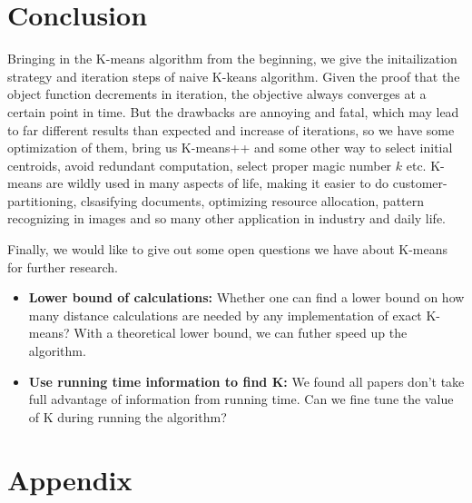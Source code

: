 \documentclass[11pt]{article}
\begin{document}
\section{Conclusion}
Bringing in the K-means algorithm from the beginning, we give the initailization strategy and iteration steps of naive K-keans algorithm.
Given the proof that the object function decrements in iteration, the objective always converges at a certain point in time. But the drawbacks are annoying and fatal, which may lead to far different results than expected and increase of iterations, so we have some optimization of them, bring us K-means++ and some other way to select initial centroids, avoid redundant computation, select proper magic number $k$ etc.
K-means are wildly used in many aspects of life, making it easier to do customer-partitioning, clsasifying documents, optimizing resource allocation, pattern recognizing in images and so many other application in industry and daily life.\par
Finally, we would like to give out some open questions we have about K-means for further research.
\begin{itemize}
\item \textbf{Lower bound of calculations:} Whether one can find a lower bound on how many distance calculations are needed by any implementation of exact K-means? With a theoretical lower bound, we can futher speed up the algorithm.
\item \textbf{Use running time information to find K:} We found all papers don't take full advantage of information from running time. Can we fine tune the value of K during running the algorithm?
\end{itemize}




\section*{Appendix}
\appendix
\end{document}
